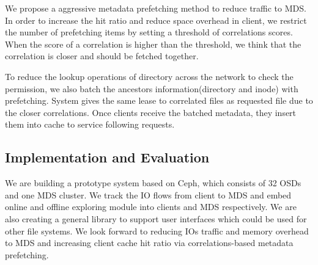We propose a aggressive metadata prefetching method to reduce traffic to MDS. In order to increase the hit ratio and reduce space overhead in client, we restrict the number of prefetching items by setting a threshold of correlations scores. When the score of a correlation is higher than the threshold, we think that the correlation is closer and should be fetched together.

To reduce the lookup operations of directory across the network to check the permission, we also batch the ancestors information(directory and inode) with prefetching. System gives the same lease to correlated files as requested file due to the closer correlations. Once clients receive the batched metadata, they insert them into cache to service following requests.

\subsection{Implementation and Evaluation}

We are building a prototype system based on Ceph, which consists of 32 OSDs and one MDS cluster. We track the IO flows from client to MDS and embed online and offline exploring module into clients and MDS respectively. We are also creating a general library to support user interfaces which could be used for other file systems. We look forward to reducing IOs traffic and memory overhead to MDS and increasing client cache hit ratio via correlations-based metadata prefetching.



